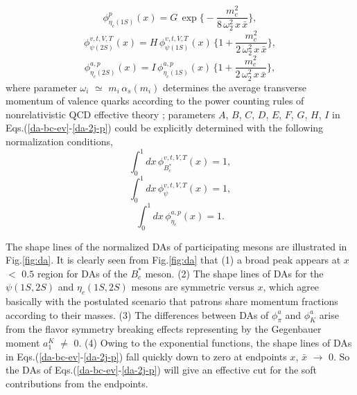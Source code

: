 \documentclass[preprint,superscriptaddress,nofootinbib]{revtex4}
\begin{document}
   \begin{equation}
  {\phi}_{{\eta}_{c}(1S)}^{p}(x)  = G\,
  {\exp}\Big\{ -\frac{ m_{c}^{2} }{ 8\,{\omega}_{2}^{2}\,x\,\bar{x} } \Big\}
   \label{da-etac-p},
   \end{equation}
   \begin{equation}
  {\phi}_{{\psi}(2S)}^{v,t,V,T}(x)  = H\, {\phi}_{{\psi}(1S)}^{v,t,V,T}(x)\,
   \Big\{ 1+\frac{m_{c}^{2}}{2\,{\omega}_{2}^{2}\,x\,\bar{x}} \Big\}
   \label{da-2j-v},
   \end{equation}
   \begin{equation}
  {\phi}_{{\eta}_{c}(2S)}^{a,p}(x)  = I\, {\phi}_{{\eta}_{c}(1S)}^{a,p}(x)\,
   \Big\{ 1+\frac{m_{c}^{2}}{2\,{\omega}_{2}^{2}\,x\,\bar{x}} \Big\}
   \label{da-2j-p},
   \end{equation}
   where parameter ${\omega}_{i}$ ${\simeq}$ $m_{i}\,{\alpha}_{s}(m_{i})$
   determines the average transverse momentum of valence quarks
   according to
   the power counting rules of nonrelativistic QCD effective theory
   \cite{prd46.4052,prd51.1125,rmp77.1423};
   parameters $A$, $B$, $C$, $D$, $E$, $F$, $G$, $H$, $I$ in
   Eqs.(\ref{da-bc-ev}-\ref{da-2j-p}) could be explicitly determined
   with the following normalization conditions,
   \begin{equation}
  {\int}_{0}^{1}dx\,{\phi}_{B_{c}^{\ast}}^{v,t,V,T}(x)=1
   \label{wave-nb},
   \end{equation}
   \begin{equation}
  {\int}_{0}^{1}dx\,{\phi}_{{\psi}}^{v,t,V,T}(x) =1
   \label{wave-nc},
   \end{equation}
   \begin{equation}
  {\int}_{0}^{1}dx\,{\phi}_{{\eta}_{c}}^{a,p}(x) =1
   \label{wave-nd}.
   \end{equation}

  The shape lines of the normalized DAs of participating mesons
  are illustrated in Fig.\ref{fig:da}.
  It is clearly seen from Fig.\ref{fig:da} that (1)
  a broad peak appears at $x$ $<$ $0.5$ region for DAs of the $B_{c}^{\ast}$ meson.
  (2) The shape lines of DAs for the ${\psi}(1S,2S)$ and ${\eta}_{c}(1S,2S)$ mesons
  are symmetric versus $x$, which agree basically with the postulated scenario that
  patrons share momentum fractions according to their masses.
  (3) The differences between DAs of ${\phi}_{\pi}^{a}$ and
  ${\phi}_{K}^{a}$ arise from the flavor symmetry breaking effects
  representing by the Gegenbauer moment $a_{1}^{K}$ ${\neq}$ $0$.
  (4) Owing to the exponential functions, the shape lines of DAs
  in Eqs.(\ref{da-bc-ev}-\ref{da-2j-p}) fall quickly down to zero at
  endpoints $x$, $\bar{x}$ ${\to}$ $0$. So the DAs of
  Eqs.(\ref{da-bc-ev}-\ref{da-2j-p}) will give an effective cut
  for the soft contributions from the endpoints.
\end{document}
